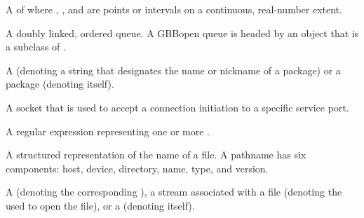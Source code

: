 \begin{glossary-list}

%
%
%
%
%
A  of   where
, , and  
are points or intervals on a continuous, real-number extent.


%
%
%
%
A doubly linked, ordered queue.  A GBBopen queue is headed by an object that
is a subclass of \textbf{}.


%
%
A  (denoting a string that designates the name or
nickname of a package) or a package (denoting itself).


%
%
A socket that is used to accept a connection initiation to a specific service
port.


%
%
%
%
A regular expression representing one or more .


\glent[pathname]
%
%
A structured representation of the name of a file. A pathname has six
components: host, device, directory, name, type, and version.


%

A  (denoting the corresponding ), a stream
associated with a file (denoting the  used to open the file),
or a  (denoting itself).


\end{glossary-list}
